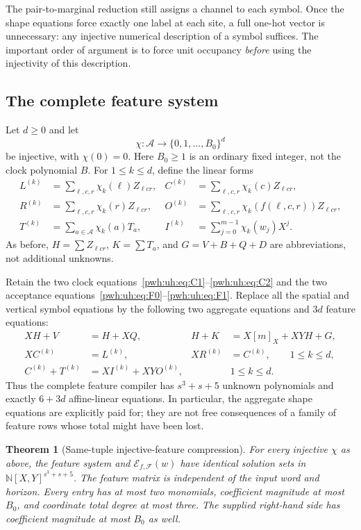\documentclass[11pt,letterpaper]{article}
\numberwithin{equation}{section}
\newtheorem{theorem}{Theorem}[section]
\theoremstyle{definition}
\newcommand{\N}{\mathbb N}
\newcommand{\A}{\mathcal A}
\newcommand{\F}{\mathcal F}
\newcommand{\System}{\ensuremath{\mathcal E_{f,\F}(w)}}
\begin{document}
The pair-to-marginal reduction still assigns a channel to each symbol.
Once the shape equations force exactly one label at each site, a full
one-hot vector is unnecessary: any injective numerical description of a
symbol suffices. The important order of argument is to force unit
occupancy \emph{before} using the injectivity of this description.

\subsection{The complete feature system}

Let $d\ge0$ and let
\[
 \chi:\A\longrightarrow\{0,1,\ldots,B_0\}^{d}
\]
be injective, with $\chi(0)=0$. Here $B_0\ge1$ is an ordinary fixed integer,
not the clock polynomial $B$. For $1\le k\le d$, define the linear forms
\begin{align*}
 L^{(k)}&=\sum_{\ell,c,r}\chi_k(\ell)Z_{\ell c r}, &
 C^{(k)}&=\sum_{\ell,c,r}\chi_k(c)Z_{\ell c r},\\
 R^{(k)}&=\sum_{\ell,c,r}\chi_k(r)Z_{\ell c r}, &
 O^{(k)}&=\sum_{\ell,c,r}\chi_k(f(\ell,c,r))Z_{\ell c r},\\
 T^{(k)}&=\sum_{a\in\A}\chi_k(a)T_a, &
 I^{(k)}&=\sum_{j=0}^{m-1}\chi_k(w_j)X^j.
\end{align*}
As before, $H=\sum Z_{\ell c r}$, $K=\sum T_a$, and
$G=V+B+Q+D$ are abbreviations, not additional unknowns.

Retain the two clock equations~\eqref{pwh:uh:eq:C1}--\eqref{pwh:uh:eq:C2} and the two
acceptance equations~\eqref{pwh:uh:eq:F0}--\eqref{pwh:uh:eq:F1}. Replace all the spatial
and vertical symbol equations by the following two aggregate equations
and $3d$ feature equations:
\begin{align}
 XH+V&=H+XQ, &
 H+K&=X[m]_X+XYH+G,
 \label{pwh:uh:eq:feature-shape}\\
 XC^{(k)}&=L^{(k)}, &
 XR^{(k)}&=C^{(k)},
 \qquad 1\le k\le d,
 \label{pwh:uh:eq:feature-spatial}\\
 C^{(k)}+T^{(k)}&=XI^{(k)}+XYO^{(k)},
 &&1\le k\le d.
 \label{pwh:uh:eq:feature-vertical}
\end{align}
Thus the complete feature compiler has $s^3+s+5$ unknown polynomials and
exactly $6+3d$ affine-linear equations. In particular, the aggregate
shape equations are explicitly paid for; they are not free consequences
of a family of feature rows whose total might have been lost.

\begin{theorem}[Same-tuple injective-feature compression]
\label{pwh:uh:thm:features}
For every injective $\chi$ as above, the feature system and \System{} have
identical solution sets in $\N[X,Y]^{s^3+s+5}$. The feature matrix is
independent of the input word and horizon. Every entry has at most two
monomials, coefficient magnitude at most $B_0$, and coordinate total
degree at most three. The supplied right-hand side has coefficient
magnitude at most $B_0$ as well.
\end{theorem}
\end{document}
